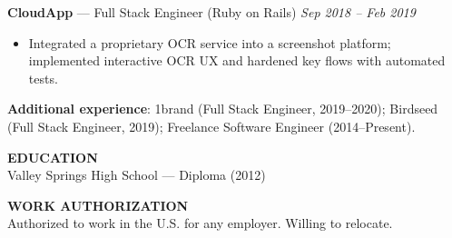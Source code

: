 \documentclass[10pt]{article}
\begin{document}
\textbf{CloudApp} --- Full Stack Engineer (Ruby on Rails) \hfill \textit{Sep 2018 -- Feb 2019}\\
\vspace{-6pt}
\begin{itemize}
  \setlength\itemsep{-2pt}
  \setlength\parskip{0pt}
  \setlength\parsep{0pt}
  \item Integrated a proprietary OCR service into a screenshot platform; implemented interactive OCR UX and hardened key flows with automated tests.
\end{itemize}

\textbf{Additional experience}: 1brand (Full Stack Engineer, 2019--2020); Birdseed (Full Stack Engineer, 2019); Freelance Software Engineer (2014--Present).

\vspace{4pt}
\textbf{EDUCATION}\\
Valley Springs High School --- Diploma (2012)

\vspace{2pt}
\textbf{WORK AUTHORIZATION}\\
Authorized to work in the U.S. for any employer. Willing to relocate.
\end{document}
